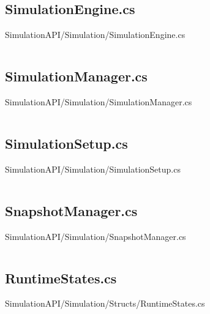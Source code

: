 \makeatletter
\subsection*{SimulationEngine.cs}
SimulationAPI/Simulation/SimulationEngine.cs
\def\@currentlabelname{SimulationEngine.cs}
\label{code:SimulationAPI:Simulation:SimulationEngine.cs}
\makeatother

\inputminted[linenos,breaklines,tabsize=2]{csharp}{/Users/Henry/Desktop/NEAComputerScience/SimulationAPI/Simulation/SimulationEngine.cs}

\makeatletter
\subsection*{SimulationManager.cs}
SimulationAPI/Simulation/SimulationManager.cs
\def\@currentlabelname{SimulationManager.cs}
\label{code:SimulationAPI:Simulation:SimulationManager.cs}
\makeatother

\inputminted[linenos,breaklines,tabsize=2]{csharp}{/Users/Henry/Desktop/NEAComputerScience/SimulationAPI/Simulation/SimulationManager.cs}

\makeatletter
\subsection*{SimulationSetup.cs}
SimulationAPI/Simulation/SimulationSetup.cs
\def\@currentlabelname{SimulationSetup.cs}
\label{code:SimulationAPI:Simulation:SimulationSetup.cs}
\makeatother

\inputminted[linenos,breaklines,tabsize=2]{csharp}{/Users/Henry/Desktop/NEAComputerScience/SimulationAPI/Simulation/SimulationSetup.cs}

\makeatletter
\subsection*{SnapshotManager.cs}
SimulationAPI/Simulation/SnapshotManager.cs
\def\@currentlabelname{SnapshotManager.cs}
\label{code:SimulationAPI:Simulation:SnapshotManager.cs}
\makeatother

\inputminted[linenos,breaklines,tabsize=2]{csharp}{/Users/Henry/Desktop/NEAComputerScience/SimulationAPI/Simulation/SnapshotManager.cs}

\makeatletter
\subsection*{RuntimeStates.cs}
SimulationAPI/Simulation/Structs/RuntimeStates.cs
\def\@currentlabelname{RuntimeStates.cs}
\label{code:SimulationAPI:Simulation:Structs:RuntimeStates.cs}
\makeatother

